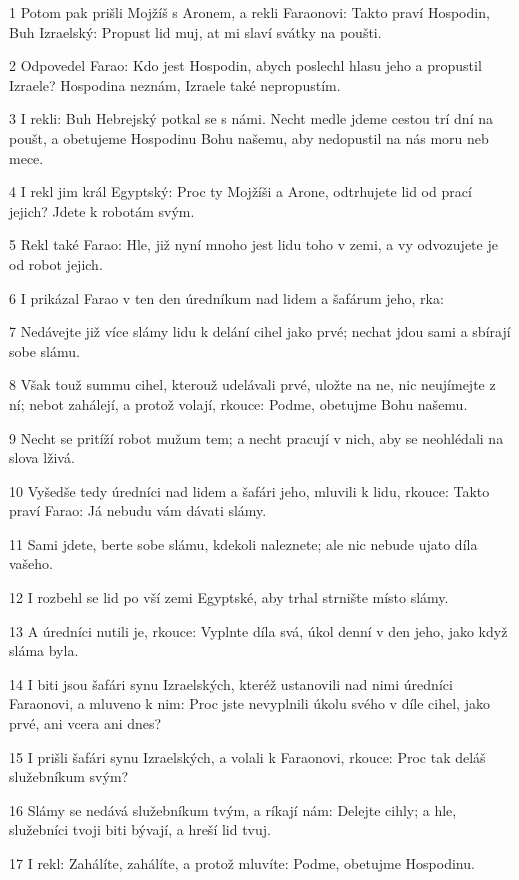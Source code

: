 \par 1 Potom pak prišli Mojžíš s Aronem, a rekli Faraonovi: Takto praví Hospodin, Buh Izraelský: Propust lid muj, at mi slaví svátky na poušti.
\par 2 Odpovedel Farao: Kdo jest Hospodin, abych poslechl hlasu jeho a propustil Izraele? Hospodina neznám, Izraele také nepropustím.
\par 3 I rekli: Buh Hebrejský potkal se s námi. Necht medle jdeme cestou trí dní na poušt, a obetujeme Hospodinu Bohu našemu, aby nedopustil na nás moru neb mece.
\par 4 I rekl jim král Egyptský: Proc ty Mojžíši a Arone, odtrhujete lid od prací jejich? Jdete k robotám svým.
\par 5 Rekl také Farao: Hle, již nyní mnoho jest lidu toho v zemi, a vy odvozujete je od robot jejich.
\par 6 I prikázal Farao v ten den úredníkum nad lidem a šafárum jeho, rka:
\par 7 Nedávejte již více slámy lidu k delání cihel jako prvé; nechat jdou sami a sbírají sobe slámu.
\par 8 Však touž summu cihel, kterouž udelávali prvé, uložte na ne, nic neujímejte z ní; nebot zahálejí, a protož volají, rkouce: Podme, obetujme Bohu našemu.
\par 9 Necht se pritíží robot mužum tem; a necht pracují v nich, aby se neohlédali na slova lživá.
\par 10 Vyšedše tedy úredníci nad lidem a šafári jeho, mluvili k lidu, rkouce: Takto praví Farao: Já nebudu vám dávati slámy.
\par 11 Sami jdete, berte sobe slámu, kdekoli naleznete; ale nic nebude ujato díla vašeho.
\par 12 I rozbehl se lid po vší zemi Egyptské, aby trhal strnište místo slámy.
\par 13 A úredníci nutili je, rkouce: Vyplnte díla svá, úkol denní v den jeho, jako když sláma byla.
\par 14 I biti jsou šafári synu Izraelských, kteréž ustanovili nad nimi úredníci Faraonovi, a mluveno k nim: Proc jste nevyplnili úkolu svého v díle cihel, jako prvé, ani vcera ani dnes?
\par 15 I prišli šafári synu Izraelských, a volali k Faraonovi, rkouce: Proc tak deláš služebníkum svým?
\par 16 Slámy se nedává služebníkum tvým, a ríkají nám: Delejte cihly; a hle, služebníci tvoji biti bývají, a hreší lid tvuj.
\par 17 I rekl: Zahálíte, zahálíte, a protož mluvíte: Podme, obetujme Hospodinu.
